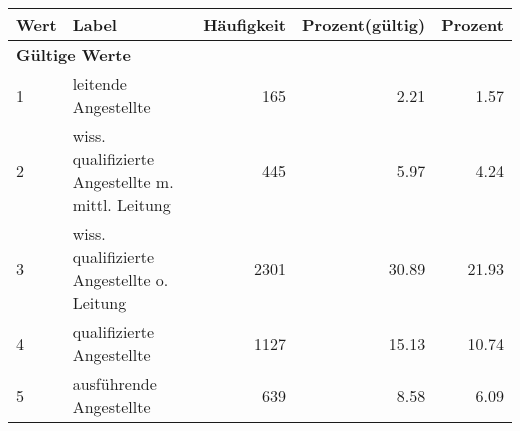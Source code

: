      \begin{longtable}{lXrrr}
     \toprule
     \textbf{Wert} & \textbf{Label} & \textbf{Häufigkeit} & \textbf{Prozent(gültig)} & \textbf{Prozent} \\
     \endhead
     \midrule
     \multicolumn{5}{l}{\textbf{Gültige Werte}}\\

     1 &
     \multicolumn{1}{X}{ leitende Angestellte   } &


       \num{165} &
       \num[round-mode=places,round-precision=2]{2,21} &
         \num[round-mode=places,round-precision=2]{1,57} \\

     2 &
     \multicolumn{1}{X}{ wiss. qualifizierte Angestellte m. mittl. Leitung   } &


       \num{445} &
       \num[round-mode=places,round-precision=2]{5,97} &
         \num[round-mode=places,round-precision=2]{4,24} \\

     3 &
     \multicolumn{1}{X}{ wiss. qualifizierte Angestellte o. Leitung   } &


       \num{2301} &
       \num[round-mode=places,round-precision=2]{30,89} &
         \num[round-mode=places,round-precision=2]{21,93} \\

     4 &
     \multicolumn{1}{X}{ qualifizierte Angestellte   } &


       \num{1127} &
       \num[round-mode=places,round-precision=2]{15,13} &
         \num[round-mode=places,round-precision=2]{10,74} \\

     5 &
     \multicolumn{1}{X}{ ausführende Angestellte   } &


       \num{639} &
       \num[round-mode=places,round-precision=2]{8,58} &
         \num[round-mode=places,round-precision=2]{6,09} \\


\end{longtable}
